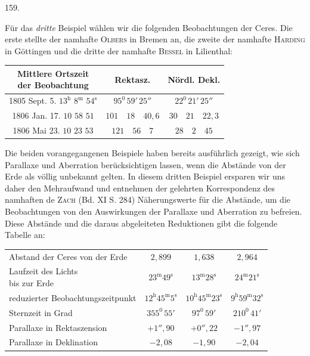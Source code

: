 \par{}\medskip
\hypertarget{native-218-article159}{}
\begin{center}159.\end{center}
Für das \emph{dritte} Beispiel wählen wir die folgenden Beobachtungen der Ceres. Die
erste stellte der namhafte \textsc{Olbers} in Bremen an, die zweite der namhafte \textsc{Harding} in Göttingen und die dritte der namhafte \textsc{Bessel} in Lilienthal:
\begin{center}\begingroup\footnotesize\setlength{\tabcolsep}{3pt}\renewcommand{\arraystretch}{1.3}
\begin{tabular}{|c|c|c|}
\hline
\shortstack{Mittlere Ortszeit\\der Beobachtung} & Rektasz. & Nördl. Dekl. \\
\hline
1805 Sept. 5. $13^{\mathrm h}$ $8^{\mathrm m}$ $54^{\mathrm s}$ & $95^0\,59'\,25''$ & $22^0\,21'\,25''$ \\
1806 Jan. 17. $10$ $58$ $51$ & $101\quad18\quad40{,}6$ & $30\quad21\quad22{,}3$ \\
1806 Mai 23. $10$ $23$ $53$ & $121\quad56\quad7$ & $28\quad2\quad45$ \\
\hline
\end{tabular}
\endgroup\end{center}

Die beiden vorangegangenen Beispiele haben bereits ausführlich gezeigt, wie sich
Parallaxe und Aberration berücksichtigen lassen, wenn die Abstände von der Erde
als völlig unbekannt gelten. In diesem dritten Beispiel ersparen wir uns daher den
Mehraufwand und entnehmen der gelehrten Korrespondenz des namhaften
de \textsc{Zach} (Bd. XI S. 284) Näherungswerte für die Abstände, um die Beobachtungen von den Auswirkungen der Parallaxe und Aberration zu befreien. Diese Abstände
und die daraus abgeleiteten Reduktionen gibt die folgende Tabelle an:
\begin{center}\begingroup\footnotesize\setlength{\tabcolsep}{3pt}\renewcommand{\arraystretch}{1.3}
\begin{tabular}{l|c|c|c}
Abstand der Ceres von der Erde & $2{,}899$ & $1{,}638$ & $2{,}964$ \\
\shortstack[l]{Laufzeit des Lichts\\bis zur Erde} & $23^{\mathrm m}49^{\mathrm s}$ & $13^{\mathrm m}28^{\mathrm s}$ & $24^{\mathrm m}21^{\mathrm s}$ \\
reduzierter Beobachtungszeitpunkt & $12^{\mathrm h}45^{\mathrm m}5^{\mathrm s}$ & $10^{\mathrm h}45^{\mathrm m}23^{\mathrm s}$ & $9^{\mathrm h}59^{\mathrm m}32^{\mathrm s}$ \\
Sternzeit in Grad & $355^0\,55'$ & $97^0\,59'$ & $210^0\,41'$ \\
Parallaxe in Rektaszension & $+1''{,}90$ & $+0''{,}22$ & $-1''{,}97$ \\
Parallaxe in Deklination & $-2{,}08$ & $-1{,}90$ & $-2{,}04$ \\
\end{tabular}
\endgroup\end{center}

